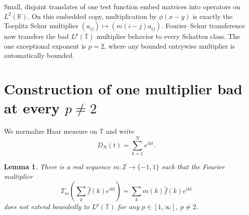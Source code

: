 \documentclass[11pt]{article}
\newtheorem{lemma}{Lemma}
\newcommand{\T}{\mathbb T}
\newcommand{\Z}{\mathbb Z}
\newcommand{\R}{\mathbb R}
\begin{document}
Small, disjoint translates of one test function embed matrices into operators
on $L^2(\R)$.  On this embedded copy, multiplication by $\phi(x-y)$ is exactly
the Toeplitz Schur multiplier $(a_{ij})\mapsto(m(i-j)a_{ij})$.  Fourier--Schur
transference now transfers the bad $L^p(\T)$ multiplier behavior to every
Schatten class.  The one exceptional exponent is $p=2$, where any bounded
entrywise multiplier is automatically bounded.

\section*{Construction of one multiplier bad at every $p\ne2$}

We normalize Haar measure on $\T$ and write
\[
   D_N(t)=\sum_{k=1}^N e^{ikt}.
\]

\begin{lemma}\label{lem:universal-sign}
There is a real sequence $m:\Z\to\{-1,1\}$ such that the Fourier multiplier
\[
  T_m\!\left(\sum_k \widehat f(k)e^{ikt}\right)
   =\sum_k m(k)\widehat f(k)e^{ikt}
\]
does not extend boundedly to $L^p(\T)$ for any
$p\in[1,\infty]$, $p\ne2$.
\end{lemma}
\end{document}
